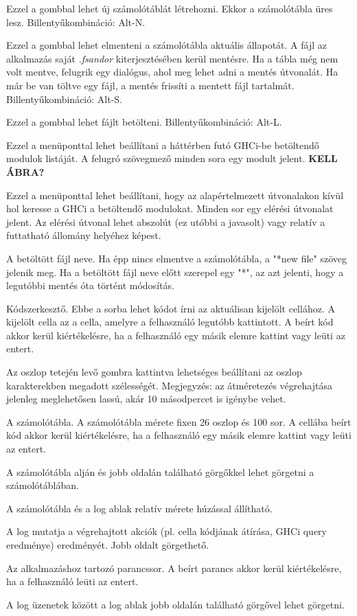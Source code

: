 \begin{compactenum}
	\item Ezzel a gombbal lehet új számolótáblát létrehozni. Ekkor a számolótábla üres lesz. Billentyűkombináció: Alt-N.
	\item Ezzel a gombbal lehet elmenteni a számolótábla aktuális állapotát. A fájl az alkalmazás saját \textit{.fsandor} kiterjesztésében kerül mentésre. Ha a tábla még nem volt mentve, felugrik egy dialógus, ahol meg lehet adni a mentés útvonalát. Ha már be van töltve egy fájl, a mentés frissíti a mentett fájl tartalmát. Billentyűkombináció: Alt-S.
	\item Ezzel a gombbal lehet fájlt betölteni. Billentyűkombináció: Alt-L.
	\item Ezzel a menüponttal lehet beállítani a háttérben futó GHCi-be betöltendő modulok listáját. A felugró szövegmező minden sora egy modult jelent. \textbf{KELL ÁBRA?}
	\item Ezzel a menüponttal lehet beállítani, hogy az alapértelmezett útvonalakon kívül hol keresse a GHCi a betöltendő modulokat. Minden sor egy elérési útvonalat jelent. Az elérési útvonal lehet abszolút (ez utóbbi a javasolt) vagy relatív a futtatható állomány helyéhez képest.
	\item A betöltött fájl neve. Ha épp nincs elmentve a számolótábla, a "*new file" szöveg jelenik meg. Ha a betöltött fájl neve előtt szerepel egy "*", az azt jelenti, hogy a legutóbbi mentés óta történt módosítás.
	\item Kódszerkesztő. Ebbe a sorba lehet kódot írni az aktuálisan kijelölt cellához. A kijelölt cella az a cella, amelyre a felhasználó legutóbb kattintott. A beírt kód akkor kerül kiértékelésre, ha a felhasználó egy másik elemre kattint vagy leüti az entert.
	\item Az oszlop tetején levő gombra kattintva lehetséges beállítani az oszlop karakterekben megadott szélességét. Megjegyzés: az átméretezés végrehajtása jelenleg meglehetősen lassú, akár 10 másodpercet is igénybe vehet.
	\item A számolótábla. A számolótábla mérete fixen 26 oszlop és 100 sor. A cellába beírt kód akkor kerül kiértékelésre, ha a felhasználó egy másik elemre kattint vagy leüti az entert.
	\item A számolótábla alján és jobb oldalán található görgőkkel lehet görgetni a számolótáblában.
	\item A számolótábla és a log ablak relatív mérete húzással állítható. 
	\item A log mutatja a végrehajtott akciók (pl. cella kódjának átírása, GHCi query eredménye) eredményét. Jobb oldalt görgethető.
	\item Az alkalmazáshoz tartozó parancssor. A beírt parancs akkor kerül kiértékelésre, ha a felhasználó leüti az entert.
	\item A log üzenetek között a log ablak jobb oldalán található görgővel lehet görgetni.
\end{compactenum}


